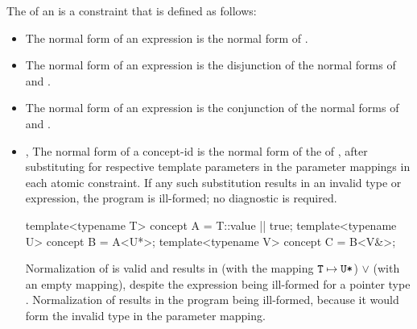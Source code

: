 \documentclass{wg21}
\begin{document}
\pnum
The  of an   is
a constraint that is defined as follows:
%
\begin{itemize}
\item
The normal form of an expression  is
the normal form of .

\item
The normal form of an expression  is
the disjunction of
the normal forms of  and .

\item
The normal form of an expression 
is the conjunction of
the normal forms of  and .


\item
{}, The normal form of a concept-id 
is the normal form of the  of ,
after substituting  for
 respective template parameters in the
parameter mappings in each atomic constraint.
If any such substitution results in an invalid type or expression,
the program is ill-formed; no diagnostic is required.
\begin{example}
    \begin{codeblock}
        template<typename T> concept A = T::value || true;
        template<typename U> concept B = A<U*>;
        template<typename V> concept C = B<V&>;
    \end{codeblock}
    Normalization of  
    is valid and results in
     (with the mapping $\texttt{T} \mapsto \texttt{U*}$)
    $\lor$
     (with an empty mapping),
    despite the expression  being ill-formed
    for a pointer type .
    Normalization of  
    results in the program being ill-formed,
    because it would form the invalid type 
    in the parameter mapping.
\end{example}


\end{itemize}
\end{document}
